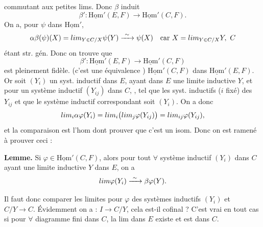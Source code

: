 \documentclass[11pt,a4paper]{article}
\begin{document}
commutant aux petites lims. Donc $\beta$ induit
\[
\beta' : \underline{\mathrm{Hom}}'(E, F) \longrightarrow
\underline{\mathrm{Hom}}'(C, F).
\]
On a, pour $\psi$ dans $\underline{\mathrm{Hom}}'$,
\[
\alpha\beta(\psi)(X) = \varinjlim_{Y \in C/X} \psi(Y)
\xrightarrow{\ \sim\ } \psi(X)
\quad \text{car } X = \varinjlim_{Y \in C/X} Y,\ C
\]
étant str. gén. Donc on trouve que
\[
\beta' : \underline{\mathrm{Hom}}'(E, F) \longrightarrow
\underline{\mathrm{Hom}}'(C, F)
\]
est pleinement fidèle. (c'est une équivalence )
$\underline{\mathrm{Hom}}'(C, F)$ dans $\underline{\mathrm{Hom}}'(E, F)$.
Or soit $(Y_i)$ un syst. inductif dans $E$, ayant dans $E$ une limite
inductive $Y$, et pour  un système inductif
$(Y_{ij})$ dans $C$, , tel que les syst. inductifs
($i$ fixé) des $Y_{ij}$  et que le
système inductif correspondant soit $(Y_i)$. On a donc
\[
\varinjlim_i \alpha\varphi(Y_i)
= \varinjlim_i \bigl(\varinjlim_j \varphi(Y_{ij})\bigr)
= \varinjlim_{ij} \varphi(Y_{ij}),
\]
et la comparaison est l'hom dont  prouver que c'est
un isom. Donc on est ramené à prouver ceci :

\textbf{Lemme.} Si $\varphi \in \underline{\mathrm{Hom}}'(C, F)$, alors
pour tout $\forall$ système inductif $(Y_i)$ dans $C$ ayant une limite
inductive $Y$ dans $E$, on a
\[
\varinjlim \varphi(Y_i) \xrightarrow{\ \sim\ } \beta\varphi(Y).
\]

Il faut donc comparer les limites pour $\varphi$ des  systèmes
inductifs $(Y_i)$ et $C/Y \to C$. Évidemment on a :
$I \to C/Y$, cela est-il cofinal ? C'est vrai en tout cas si pour
$\forall$ diagramme fini dans $C$, la lim dans $E$ existe et est dans $C$.
\end{document}
